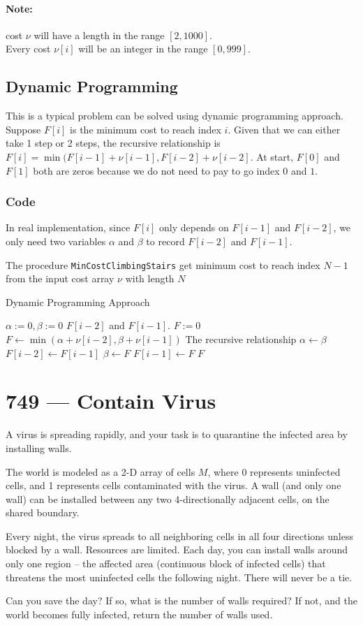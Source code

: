 \documentclass[a4paper,12pt]{article}
\begin{document}
\paragraph{Note:}
cost $\nu$ will have a length in the range $[2, 1000]$.
\\
Every cost $\nu[i]$ will be an integer in the range $[0, 999]$.
\subsection{Dynamic Programming}
This is a typical problem can be solved using dynamic programming approach. Suppose $F[i]$ is the minimum cost to reach index $i$. Given that we can either take 1 step or 2 steps, the recursive relationship is $F[i] = \min(F[i-1]+\nu[i-1], F[i-2]+\nu[i-2]$. At start, $F[0]$ and $F[1]$ both are zeros because we do not need to pay to go index $0$ and $1$.
\subsubsection{Code}
In real implementation, since $F[i]$ only depends on $F[i-1]$ and $F[i-2]$, we only need two variables $\alpha$ and $\beta$ to record $F[i-2]$ and $F[i-1]$.
\par
The procedure \texttt{MinCostClimbingStairs} get minimum cost to reach index $N-1$ from the input cost array $\nu$ with length $N$
\setcounter{algorithm}{0}
\begin{algorithm}[H]
\caption{Dynamic Programming Approach}
\begin{algorithmic}[1]
\State $\alpha:=0,\beta:=0$ \Comment $F[i-2]$ and $F[i-1]$.
\State $F:=0$
\State $F\gets \min(\alpha + \nu[i-2], \beta + \nu[i-1])$ \Comment The recursive relationship
\State $\alpha\gets \beta$ \Comment $F[i-2]\gets F[i-1]$
\State $\beta\gets F$ \Comment $F[i-1]\gets F$
\EndFor
\State \Return $F$
\EndProcedure
\end{algorithmic}
\end{algorithm}

\section{749 --- Contain Virus}
A virus is spreading rapidly, and your task is to quarantine the infected area by installing walls.
\par
The world is modeled as a 2-D array of cells $M$, where 0 represents uninfected cells, and 1 represents cells contaminated with the virus. A wall (and only one wall) can be installed between any two 4-directionally adjacent cells, on the shared boundary.
\par
Every night, the virus spreads to all neighboring cells in all four directions unless blocked by a wall. Resources are limited. Each day, you can install walls around only one region -- the affected area (continuous block of infected cells) that threatens the most uninfected cells the following night. There will never be a tie.
\par
Can you save the day? If so, what is the number of walls required? If not, and the world becomes fully infected, return the number of walls used.
\end{document}
